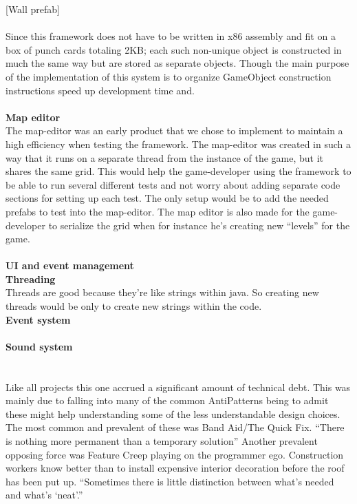 \documentclass[main.tex]{subfiles}
\begin{document}
[Wall prefab]
\\ \\
Since this framework does not have to be written in x86 assembly and fit on a box of punch cards totaling 2KB; each such non-unique object is constructed in much the same way but are stored as separate objects. Though the main purpose of the implementation of this system is to organize GameObject construction instructions speed up development time and.
\\ \\
\textbf{Map editor} \\%
The map-editor was an early product that we chose to implement to maintain a high efficiency when testing the framework. The map-editor was created in such a way that it runs on a separate thread from the instance of the game, but it shares the same grid. This would help the game-developer using the framework to be able to run several different tests and not worry about adding separate code sections for setting up each test. The only setup would be to add the needed prefabs to test into the map-editor. The map editor is also made for the game-developer to serialize the grid when for instance he’s creating new “levels” for the game.
\\ \\
\textbf{UI and event management} \\%
\textbf{Threading} \\%
Threads are good because they’re like strings within java. So creating new threads would be only to create new strings within the code.
\\
\textbf{Event system} \\%
\\
\textbf{Sound system} \\%
\\ \\
Like all projects this one accrued a significant amount of technical debt. This was mainly due to falling into many of the common AntiPatterns being to admit these might help understanding some of the less understandable design choices. The most common and prevalent of these was Band Aid/The Quick Fix. 
“There is nothing more permanent than a temporary solution”
Another prevalent opposing force was Feature Creep playing on the programmer ego. Construction workers know better than to install expensive interior decoration before the roof has been put up.
“Sometimes there is little distinction between what's needed and what's ‘neat’.”
\end{document}
